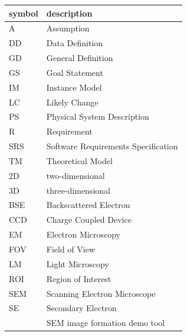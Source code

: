 \documentclass[12pt]{article}
\begin{document}
\renewcommand{\arraystretch}{1.2}
\begin{tabular}{l l} 
  \toprule		
  \textbf{symbol} & \textbf{description}\\
  \midrule 
  A & Assumption\\
  DD & Data Definition\\
  GD & General Definition\\
  GS & Goal Statement\\
  IM & Instance Model\\
  LC & Likely Change\\
  PS & Physical System Description\\
  R & Requirement\\
  SRS & Software Requirements Specification\\
  TM & Theoretical Model\\
  2D & two-dimensional\\
  3D & three-dimensional\\
  BSE & Backscattered Electron\\
  CCD & Charge Coupled Device\\
  EM & Electron Microscopy\\
  FOV & Field of View\\
  LM & Light Microscopy\\
  ROI & Region of Interest\\
  SEM & Scanning Electron Microscope\\
  SE & Secondary Electron\\
  \progname{} & SEM image formation demo tool\\
  \bottomrule
\end{tabular}\\


\end{document}
